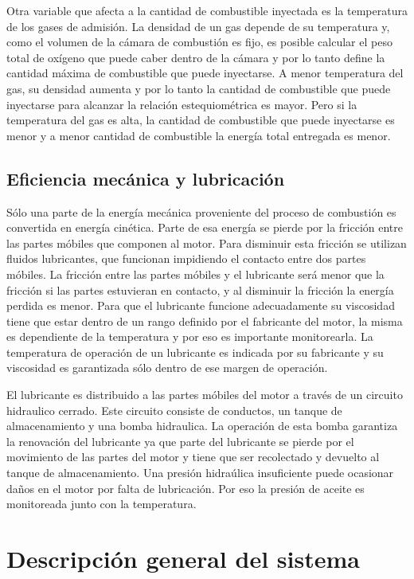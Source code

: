 Otra variable que afecta a la cantidad de combustible inyectada es la temperatura de los gases de admisión. La densidad de un gas depende de su temperatura y, como el volumen de la cámara de combustión es fijo, es posible calcular el peso total de oxígeno que puede caber dentro de la cámara y por lo tanto define la cantidad máxima de combustible que puede inyectarse. A menor temperatura del gas, su densidad aumenta y por lo tanto la cantidad de combustible que puede inyectarse para alcanzar la relación estequiométrica es mayor. Pero si la temperatura del gas es alta, la cantidad de combustible que puede inyectarse es menor y a menor cantidad de combustible la energía total entregada es menor.

\subsection{Eficiencia mecánica y lubricación}

Sólo una parte de la energía mecánica proveniente del proceso de combustión es convertida en energía cinética. Parte de esa energía se pierde por la fricción entre las partes móbiles que componen al motor. Para disminuir esta fricción se utilizan fluidos lubricantes, que funcionan impidiendo el contacto entre dos partes móbiles. La fricción entre las partes móbiles y el lubricante será menor que la fricción si las partes estuvieran en contacto, y al disminuir la fricción la energía perdida es menor. Para que el lubricante funcione adecuadamente su viscosidad tiene que estar dentro de un rango definido por el fabricante del motor, la misma es dependiente de la temperatura y por eso es importante monitorearla\cite{lubrication}. La temperatura de operación de un lubricante es indicada por su fabricante y su viscosidad es garantizada sólo dentro de ese margen de operación.

El lubricante es distribuido a las partes móbiles del motor a través de un circuito hidraulico cerrado. Este circuito consiste de conductos, un tanque de almacenamiento y una bomba hidraulica. La operación de esta bomba garantiza la renovación del lubricante ya que parte del lubricante se pierde por el movimiento de las partes del motor y tiene que ser recolectado y devuelto al tanque de almacenamiento. Una presión hidraúlica insuficiente puede ocasionar daños en el motor por falta de lubricación. Por eso la presión de aceite es monitoreada junto con la temperatura.

\section{Descripción general del sistema}

